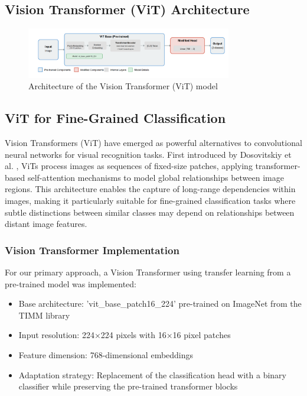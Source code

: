 \documentclass[a4paper,12pt]{report}
\begin{document}
\subsection{Vision Transformer (ViT) Architecture}

\begin{figure}[h]
    \centering
    \includegraphics[width=0.8\textwidth]{images/architecture/vit.png}
    \caption{Architecture of the Vision Transformer (ViT) model}
    \label{fig:vit_architecture}
\end{figure}

\subsection{ViT for Fine-Grained Classification}

Vision Transformers (ViT) have emerged as powerful alternatives to convolutional neural networks for visual recognition tasks. First introduced by Dosovitskiy et al. \citep{dosovitskiy2021imageworth16x16words}, ViTs process images as sequences of fixed-size patches, applying transformer-based self-attention mechanisms to model global relationships between image regions. This architecture enables the capture of long-range dependencies within images, making it particularly suitable for fine-grained classification tasks where subtle distinctions between similar classes may depend on relationships between distant image features.

\subsubsection{Vision Transformer Implementation}

For our primary approach, a Vision Transformer using transfer learning from a pre-trained model was implemented:

\begin{itemize}
    \item Base architecture: 'vit\_base\_patch16\_224' pre-trained on ImageNet from the TIMM library \citep{rwightman2021pytorch}
    \item Input resolution: 224×224 pixels with 16×16 pixel patches
    \item Feature dimension: 768-dimensional embeddings
    \item Adaptation strategy: Replacement of the classification head with a binary classifier while preserving the pre-trained transformer blocks
\end{itemize}
\end{document}
